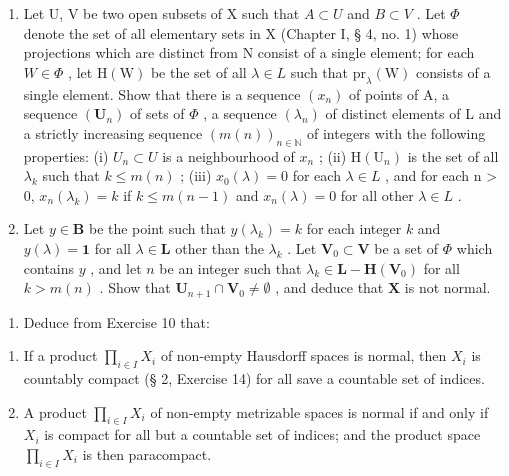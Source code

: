 \begin{enumerate}
\def\labelenumi{\alph{enumi})}
\setcounter{enumi}{1}
\item
  Let U, V be two open subsets of X such that \(A \subset U\) and \(B \subset V\) . Let \(\Phi\) denote the set of all elementary sets in X (Chapter I, § 4, no. 1) whose projections which are distinct from N consist of a single element; for each \(W \in \Phi\) , let \(\mathrm{H}(\mathrm{W})\) be the set of all \(\lambda \in L\) such that \(\mathrm{pr}_{\lambda}(\mathrm{W})\) consists of a single element. Show that there is a sequence \((x_{n})\) of points of A, a sequence \((\mathbf{U}_{n})\) of sets of \(\Phi\) , a sequence \((\lambda_{n})\) of distinct elements of L and a strictly increasing sequence \((m(n))_{n \in \mathbb{N}}\) of integers with the following properties: (i) \(U_{n} \subset U\) is a neighbourhood of \(x_{n}\) ; (ii) \(\mathrm{H}(\mathrm{U}_{n})\) is the set of all \(\lambda_{k}\) such that \(k \leqslant m(n)\) ; (iii) \(x_{0}(\lambda) = 0\) for each \(\lambda \in L\) , and for each n \textgreater{} 0, \(x_{n}(\lambda_{k}) = k\) if \(k \leqslant m(n - 1)\) and \(x_{n}(\lambda) = 0\) for all other \(\lambda \in L\) .
\item
  Let \(y \in \mathbf{B}\) be the point such that \(y(\lambda_k) = k\) for each integer \(k\) and \(y(\lambda) = \mathbf{1}\) for all \(\lambda \in \mathbf{L}\) other than the \(\lambda_k\) . Let \(\mathbf{V}_0 \subset \mathbf{V}\) be a set of \(\Phi\) which contains \(y\) , and let \(n\) be an integer such that \(\lambda_k \in \mathbf{L} - \mathbf{H}(\mathbf{V}_0)\) for all \(k > m(n)\) . Show that \(\mathbf{U}_{n+1} \cap \mathbf{V}_0 \neq \emptyset\) , and deduce that \(\mathbf{X}\) is not normal.
\end{enumerate}

\begin{enumerate}
\def\labelenumi{\arabic{enumi})}
\setcounter{enumi}{10}
\tightlist
\item
  Deduce from Exercise 10 that:
\end{enumerate}

\begin{enumerate}
\def\labelenumi{\alph{enumi})}
\item
  If a product \(\prod_{i\in I}X_i\) of non-empty Hausdorff spaces is normal, then \(X_i\) is countably compact (§ 2, Exercise 14) for all save a countable set of indices.
\item
  A product \(\prod_{i\in I}X_i\) of non-empty metrizable spaces is normal if and only if \(X_{i}\) is compact for all but a countable set of indices; and the product space \(\prod_{i\in I}X_{i}\) is then paracompact.
\end{enumerate}

